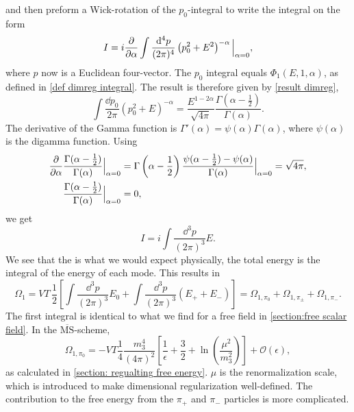 and then preform a Wick-rotation of the $p_0$-integral to write the integral on the form
\begin{equation}
    I = i \pdv{\alpha} \int \frac{\dd^4 p}{(2 \pi)^4} \left(p_0^2 + E^2\right)^{-\alpha} \Big|_{\alpha=0},
\end{equation}
where $p$ now is a Euclidean four-vector.
The $p_0$ integral equals $\Phi_1(E, 1, \alpha)$, as defined in \autoref{def dimreg integral}. 
The result is therefore given by \autoref{result dimreg},
\begin{equation}
    \int \frac{\dd p_0}{2 \pi} (p_0^2 + E)^{-\alpha} 
    = \frac{E^{1-2\alpha}}{\sqrt{4 \pi}} \frac{\Gamma(\alpha-\frac{1}{2})}{\Gamma(\alpha)}.
\end{equation}
The derivative of the Gamma function is $\Gamma'(\alpha) = \psi(\alpha)\Gamma(\alpha)$, where $\psi(\alpha)$ is the digamma function.
Using
\begin{align}
    \diffp{}{\alpha} & \frac{\Gamma(\alpha - \frac{1}{2}) }{\Gamma(\alpha)} \Big|_{\alpha=0}
    = \Gamma\left(\alpha - \frac{1}{2}\right) \frac{\psi(\alpha - \frac{1}{2}) - \psi(\alpha)}{\Gamma(\alpha)} \Big|_{\alpha=0}
    = \sqrt{4 \pi}, \\
    & \frac{\Gamma(\alpha - \frac{1}{2}) }{\Gamma(\alpha)}\Big|_{\alpha=0} = 0,
\end{align}
we get
\begin{equation}
    I = i \int \frac{\dd^3 p}{(2 \pi)^3} E.
\end{equation}
We see that the is what we would expect physically, the total energy is the integral of the energy of each mode.
This results in 
\begin{equation}
    \Omega_1 = 
    V T \, \frac{1}{2} 
    \left[\int \frac{\dd^3 p}{(2\pi)^3} E_0 + \int  \frac{\dd^3 p}{(2\pi)^3} (E_+ + E_-)\right]
    = \Omega_{1, \pi_0} + \Omega_{1, \pi_\pm} + \Omega_{1, \pi_-}.
\end{equation}
The first integral is identical to what we find for a free field in \autoref{section:free scalar field}.
In the $\overline{\mathrm{MS}}$-scheme,
\begin{equation}
    \Omega_{1, \pi_0} 
    = 
    - VT \frac{1}{4} \frac{m_3^4}{(4\pi)^2} 
    \left[ \frac{1}{\epsilon} + \frac{3}{2} + \ln(\frac{\mu^2}{m_3^2}) \right] + \mathcal{O}(\epsilon),
\end{equation}
as calculated in \autoref{section: regualting free energy}.
$\mu$ is the renormalization scale, which is introduced to make dimensional regularization well-defined.
The contribution to the free energy from the $\pi_+$ and $\pi_-$ particles is more complicated.
